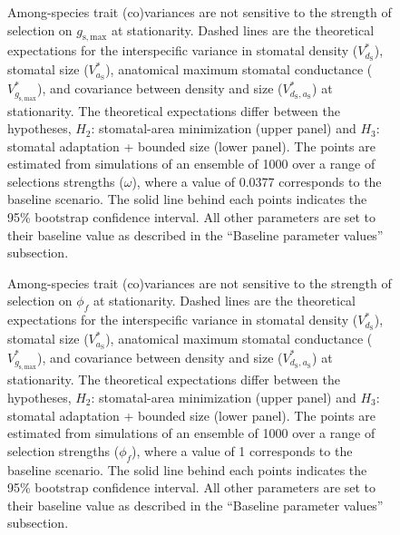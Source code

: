 \documentclass[
  letterpaper,
  DIV=11,
  numbers=noendperiod]{scrartcl}
\begin{document}
\begin{figure}
\caption{Among-species trait (co)variances are not sensitive to the strength of selection on $g_\mathrm{s,max}$ at stationarity. Dashed lines are the theoretical expectations for the interspecific variance in stomatal density ($V_{d_\mathrm{S}}^*$), stomatal size ($V_{a_\mathrm{S}}^*$), anatomical maximum stomatal conductance ($V_{g_\mathrm{s,max}}^*$), and covariance between density and size ($V_{d_\mathrm{S},a_\mathrm{S}}^*$) at stationarity. The theoretical expectations differ between the hypotheses, $H_2$: stomatal-area minimization (upper panel) and $H_3$: stomatal adaptation + bounded size (lower panel). The points are estimated from simulations of an ensemble of 1000 over a range of selections strengths ($\omega$), where a value of 0.0377 corresponds to the baseline scenario. The solid line behind each points indicates the 95\% bootstrap confidence interval. All other parameters are set to their baseline value as described in the ``Baseline parameter values'' subsection.}

\end{figure}

\newpage

\begin{figure}
\caption{Among-species trait (co)variances are not sensitive to the strength of selection on $\phi_f$ at stationarity. Dashed lines are the theoretical expectations for the interspecific variance in stomatal density ($V_{d_\mathrm{S}}^*$), stomatal size ($V_{a_\mathrm{S}}^*$), anatomical maximum stomatal conductance ($V_{g_\mathrm{s,max}}^*$), and covariance between density and size ($V_{d_\mathrm{S},a_\mathrm{S}}^*$) at stationarity. The theoretical expectations differ between the hypotheses, $H_2$: stomatal-area minimization (upper panel) and $H_3$: stomatal adaptation + bounded size (lower panel). The points are estimated from simulations of an ensemble of 1000 over a range of selection strengths ($\phi_f$), where a value of 1 corresponds to the baseline scenario. The solid line behind each points indicates the 95\% bootstrap confidence interval. All other parameters are set to their baseline value as described in the ``Baseline parameter values'' subsection.}

\end{figure}

\newpage
\end{document}
